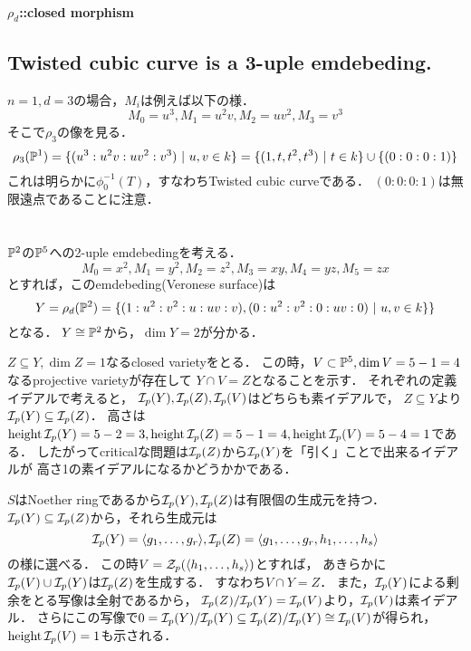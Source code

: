 \documentclass[a4paper]{jarticle}
\begin{document}
    \paragraph{$\rho_d$::closed morphism}

    \subsection{Twisted cubic curve is a 3-uple emdebeding.}
    $n=1, d=3$の場合，$M_i$は例えば以下の様．
    \[ M_0=u^3, M_1=u^2 v, M_2=u v^2, M_3=v^3 \]
    そこで$\rho_3$の像を見る．
    \[ \rho_3(\mathbb{P}^1)=\{ (u^3: u^2v: u v^2: v^3) ~|~ u,v \in k \}=\{ (1,t, t^2, t^3) ~|~ t \in k \} \cup \{(0:0:0:1)\}\]
    これは明らかに$\phi_0^{-1}(T)$，すなわちTwisted cubic curveである．
    $(0:0:0:1)$は無限遠点であることに注意．

\section{} %
    $\mathbb{P}^2$の$\mathbb{P}^5$への2-uple emdebedingを考える．
    \[ M_0=x^2, M_1=y^2, M_2=z^2, M_3=xy, M_4=yz, M_5=zx \]
    とすれば，このemdebeding(Veronese surface)は
    \[ Y=\rho_d(\mathbb{P}^2)=\{ (1: u^2: v^2: u: uv: v), (0:u^2:v^2:0:uv:0) ~|~ u,v \in k \} \} \]
    となる．
    $Y \cong \mathbb{P}^2$から，$\dim  Y=2$が分かる．

    $Z \subseteq Y, \dim Z=1$なるclosed varietyをとる．
    この時，$V \subset \mathbb{P}^5, \dim V=5-1=4$なるprojective varietyが存在して
    $Y \cap V=Z$となることを示す．
    それぞれの定義イデアルで考えると，
    $\mathcal{I}_p(Y), \mathcal{I}_p(Z), \mathcal{I}_p(V)$はどちらも素イデアルで，
    $Z \subseteq Y$より$\mathcal{I}_p(Y) \subseteq \mathcal{I}_p(Z)$．
    高さは$\operatorname{height} \mathcal{I}_p(Y)=5-2=3, \operatorname{height} \mathcal{I}_p(Z)=5-1=4, \operatorname{height} \mathcal{I}_p(V)=5-4=1$である．
    したがってcriticalな問題は$\mathcal{I}_p(Z)$から$\mathcal{I}_p(Y)$を「引く」ことで出来るイデアルが
    高さ1の素イデアルになるかどうかかである．

    $S$はNoether ringであるから$\mathcal{I}_p(Y), \mathcal{I}_p(Z)$は有限個の生成元を持つ．
    $\mathcal{I}_p(Y) \subseteq \mathcal{I}_p(Z)$から，それら生成元は
    \[ \mathcal{I}_p(Y)=\langle g_1,\dots,g_r \rangle, \mathcal{I}_p(Z)=\langle g_1,\dots,g_r, h_1,\dots,h_s \rangle \]
    の様に選べる．
    この時$V=\mathcal{Z}_p(\langle h_1,\dots,h_s \rangle)$とすれば，
    あきらかに$\mathcal{I}_p(V) \cup \mathcal{I}_p(Y)$は$\mathcal{I}_p(Z)$を生成する．
    すなわち$V \cap Y=Z$．
    また，$\mathcal{I}_p(Y)$による剰余をとる写像は全射であるから，
    $\mathcal{I}_p(Z)/\mathcal{I}_p(Y)=\mathcal{I}_p(V)$より，$\mathcal{I}_p(V)$は素イデアル．
    さらにこの写像で$0=\mathcal{I}_p(Y)/\mathcal{I}_p(Y) \subseteq \mathcal{I}_p(Z)/\mathcal{I}_p(Y) \cong \mathcal{I}_p(V)$が得られ，
    $\operatorname{height} \mathcal{I}_p(V)=1$も示される．
\end{document}
